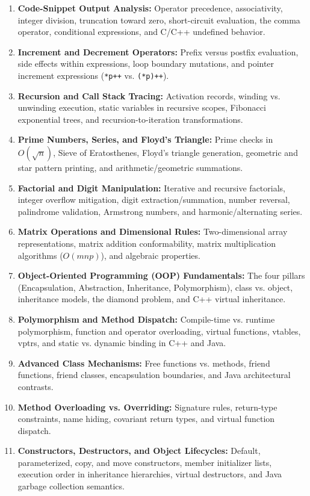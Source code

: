 \begin{enumerate}[label=\bfseries\arabic*.]
    \item \textbf{Code-Snippet Output Analysis:} Operator precedence, associativity, integer division, truncation toward zero, short-circuit evaluation, the comma operator, conditional expressions, and C/C++ undefined behavior.
    \item \textbf{Increment and Decrement Operators:} Prefix versus postfix evaluation, side effects within expressions, loop boundary mutations, and pointer increment expressions (\texttt{*p++} vs. \texttt{(*p)++}).
    \item \textbf{Recursion and Call Stack Tracing:} Activation records, winding vs. unwinding execution, static variables in recursive scopes, Fibonacci exponential trees, and recursion-to-iteration transformations.
    \item \textbf{Prime Numbers, Series, and Floyd's Triangle:} Prime checks in $O(\sqrt{n})$, Sieve of Eratosthenes, Floyd's triangle generation, geometric and star pattern printing, and arithmetic/geometric summations.
    \item \textbf{Factorial and Digit Manipulation:} Iterative and recursive factorials, integer overflow mitigation, digit extraction/summation, number reversal, palindrome validation, Armstrong numbers, and harmonic/alternating series.
    \item \textbf{Matrix Operations and Dimensional Rules:} Two-dimensional array representations, matrix addition conformability, matrix multiplication algorithms ($O(mnp)$), and algebraic properties.
    \item \textbf{Object-Oriented Programming (OOP) Fundamentals:} The four pillars (Encapsulation, Abstraction, Inheritance, Polymorphism), class vs. object, inheritance models, the diamond problem, and C++ virtual inheritance.
    \item \textbf{Polymorphism and Method Dispatch:} Compile-time vs. runtime polymorphism, function and operator overloading, virtual functions, vtables, vptrs, and static vs. dynamic binding in C++ and Java.
    \item \textbf{Advanced Class Mechanisms:} Free functions vs. methods, friend functions, friend classes, encapsulation boundaries, and Java architectural contrasts.
    \item \textbf{Method Overloading vs. Overriding:} Signature rules, return-type constraints, name hiding, covariant return types, and virtual function dispatch.
    \item \textbf{Constructors, Destructors, and Object Lifecycles:} Default, parameterized, copy, and move constructors, member initializer lists, execution order in inheritance hierarchies, virtual destructors, and Java garbage collection semantics.

\end{enumerate}
